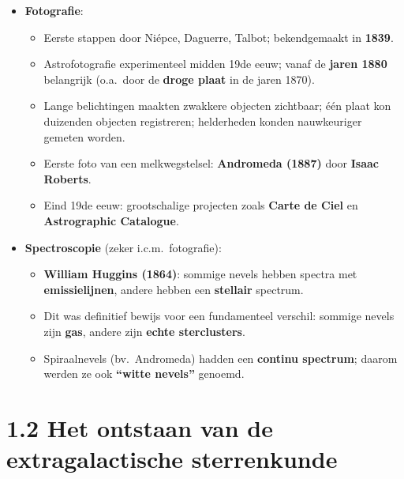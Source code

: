 \documentclass[10pt,a4paper]{article}
\begin{document}
\begin{itemize}
\begin{itemize}
  \end{itemize}
  \item \textbf{Fotografie}:
  \begin{itemize}
    \item Eerste stappen door Ni\'epce, Daguerre, Talbot; bekendgemaakt in \textbf{1839}.
    \item Astrofotografie experimenteel midden 19de eeuw; vanaf de \textbf{jaren 1880} belangrijk (o.a.\ door de \textbf{droge plaat} in de jaren 1870).
    \item Lange belichtingen maakten zwakkere objecten zichtbaar; één plaat kon duizenden objecten registreren; helderheden konden nauwkeuriger gemeten worden.
    \item Eerste foto van een melkwegstelsel: \textbf{Andromeda (1887)} door \textbf{Isaac Roberts}.
    \item Eind 19de eeuw: grootschalige projecten zoals \textbf{Carte de Ciel} en \textbf{Astrographic Catalogue}.
  \end{itemize}
  \item \textbf{Spectroscopie} (zeker i.c.m.\ fotografie):
  \begin{itemize}
    \item \textbf{William Huggins (1864)}: sommige nevels hebben spectra met \textbf{emissielijnen}, andere hebben een \textbf{stellair} spectrum.
    \item Dit was definitief bewijs voor een fundamenteel verschil: sommige nevels zijn \textbf{gas}, andere zijn \textbf{echte sterclusters}.
    \item Spiraalnevels (bv.\ Andromeda) hadden een \textbf{continu spectrum}; daarom werden ze ook \textbf{``witte nevels''} genoemd.
  \end{itemize}
\end{itemize}

\section*{1.2 Het ontstaan van de extragalactische sterrenkunde}
\end{document}
